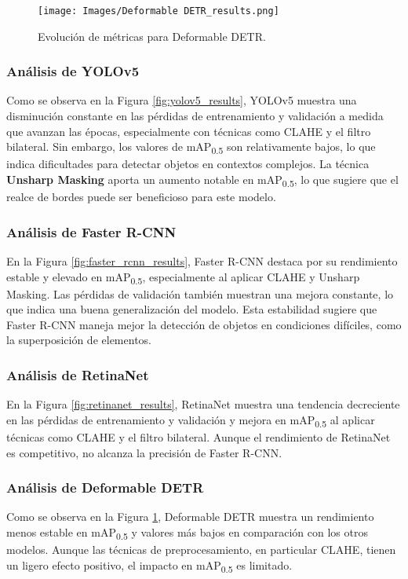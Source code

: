 \begin{figure}[htbp]
    \centering
    \texttt{[image: Images/Deformable DETR\_results.png]}
    \caption{Evolución de métricas para Deformable DETR.}
    \label{fig:deformable_detr_results}
\end{figure}

\subsubsection*{Análisis de YOLOv5}
Como se observa en la Figura \ref{fig:yolov5_results}, YOLOv5 muestra una disminución constante en las pérdidas de entrenamiento y validación a medida que avanzan las épocas, especialmente con técnicas como CLAHE y el filtro bilateral.
Sin embargo, los valores de mAP\textsubscript{0.5} son relativamente bajos, lo que indica dificultades para detectar objetos en contextos complejos.
La técnica \textbf{Unsharp Masking} aporta un aumento notable en mAP\textsubscript{0.5}, lo que sugiere que el realce de bordes puede ser beneficioso para este modelo.

\subsubsection*{Análisis de Faster R-CNN}
En la Figura \ref{fig:faster_rcnn_results}, Faster R-CNN destaca por su rendimiento estable y elevado en mAP\textsubscript{0.5}, especialmente al aplicar CLAHE y Unsharp Masking.
Las pérdidas de validación también muestran una mejora constante, lo que indica una buena generalización del modelo.
Esta estabilidad sugiere que Faster R-CNN maneja mejor la detección de objetos en condiciones difíciles, como la superposición de elementos.

\subsubsection*{Análisis de RetinaNet}
En la Figura \ref{fig:retinanet_results}, RetinaNet muestra una tendencia decreciente en las pérdidas de entrenamiento y validación y mejora en mAP\textsubscript{0.5} al aplicar técnicas como CLAHE y el filtro bilateral.
Aunque el rendimiento de RetinaNet es competitivo, no alcanza la precisión de Faster R-CNN.

\subsubsection*{Análisis de Deformable DETR}
Como se observa en la Figura \ref{fig:deformable_detr_results}, Deformable DETR muestra un rendimiento menos estable en mAP\textsubscript{0.5} y valores más bajos en comparación con los otros modelos.
Aunque las técnicas de preprocesamiento, en particular CLAHE, tienen un ligero efecto positivo, el impacto en mAP\textsubscript{0.5} es limitado.

